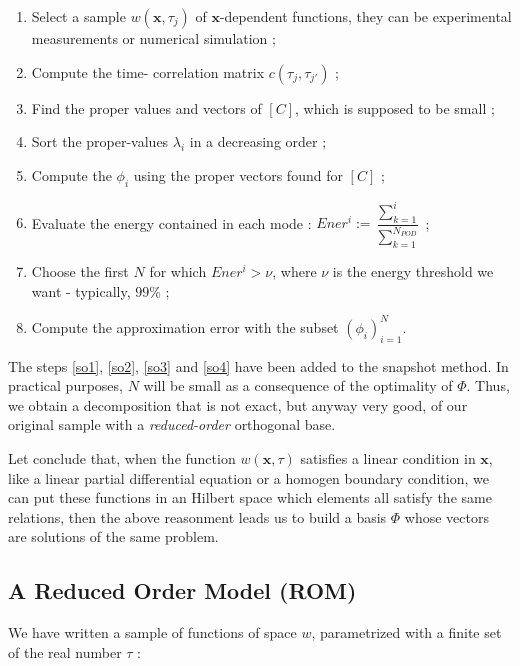 \begin{algo}\label{a_snap}
\begin{enumerate}
\item Select a sample $w(\mathbf{x},\tau_j)$ of $\mathbf{x}$-dependent functions, %
they can be experimental measurements or numerical simulation ;
\item Compute the \og{}time-\fg{} correlation matrix $c(\tau_j ,\tau_{j'})$ ;
\item Find the proper values and vectors of $[C]$, which is supposed to be small ;
\item\label{so1} Sort the proper-values $\lambda_i$ in a decreasing order ;
\item Compute the $\phi_i$ using the proper vectors found for $[C]$ ;
\item\label{so2} Evaluate the energy contained in each mode : $Ener^i:=\dfrac{\sum\limits_{k=1}^i}{\sum\limits_{k=1}^{N_{POD}}}$ ;
\item\label{so3} Choose the first $N$ for which $Ener^i >\nu$, where $\nu$ is the energy threshold we want - typically, $99\%$ ;
\item\label{so4} Compute the approximation error with the subset $(\phi_i)_{i=1}^{N}$.
\end{enumerate}
\end{algo}

The steps \ref{so1}, \ref{so2}, \ref{so3} and \ref{so4} have been added to the snapshot method. %
In practical purposes, $N$ will be small as a consequence of the optimality of $\Phi$. %
Thus, we obtain a decomposition that is not exact, but anyway very good, of our original sample with a \emph{reduced-order} orthogonal base.

\ligneinter
Let conclude that, when the function $w(\mathbf{x},\tau)$ satisfies a linear condition in $\mathbf{x}$, %
like a linear partial differential equation or a homogen boundary condition, %
we can put these functions in an Hilbert space which elements all satisfy the same relations, %
then the above reasonment leads us to build a basis $\Phi$ whose vectors are solutions of the same problem.

\subsection{A Reduced Order Model (ROM)}

We have written a sample of functions of space $w$, parametrized with a finite set of the real number $\tau$ :

